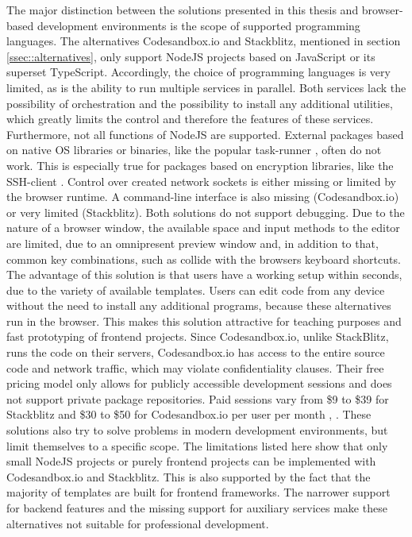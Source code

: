         The major distinction between the solutions presented in this thesis and browser-based development environments is the scope of supported programming languages. The alternatives Codesandbox.io and Stackblitz, mentioned in section \ref{ssec::alternatives}, only support NodeJS projects based on JavaScript or its superset TypeScript. Accordingly, the choice of programming languages is very limited, as is the ability to run multiple services in parallel. Both services lack the possibility of orchestration and the possibility to install any additional utilities, which greatly limits the control and therefore the features of these services. \newline
        Furthermore, not all functions of NodeJS are supported. External packages based on native \ac{OS} libraries or binaries, like the popular task-runner , often do not work. This is especially true for packages based on encryption libraries, like the \ac{SSH}-client . Control over created network sockets is either missing or limited by the browser runtime. A command-line interface is also missing (Codesandbox.io) or very limited (Stackblitz). Both solutions do not support debugging. Due to the nature of a browser window, the available space and input methods to the editor are limited, due to an omnipresent preview window and, in addition to that, common key combinations, such as  collide with the browsers keyboard shortcuts.\newline
        The advantage of this solution is that users have a working setup within seconds, due to the variety of available templates. Users can edit code from any device without the need to install any additional programs, because these alternatives run in the browser. This makes this solution attractive for teaching purposes and fast prototyping of frontend projects.\newline
        Since Codesandbox.io, unlike StackBlitz, runs the code on their servers, Codesandbox.io has access to the entire source code and network traffic, which may violate confidentiality clauses. Their free pricing model only allows for publicly accessible development sessions and does not support private  package repositories. Paid sessions vary from \$9 to \$39 for Stackblitz and \$30 to \$50 for Codesandbox.io per user per month \cite{stackblitz}, \cite{codesandbox}. \newline
        These solutions also try to solve problems in modern development environments, but limit themselves to a specific scope. The limitations listed here show that only small NodeJS projects or purely frontend projects can be implemented with Codesandbox.io and Stackblitz. This is also supported by the fact that the majority of templates are built for frontend frameworks. The narrower support for backend features and the missing support for auxiliary services make these alternatives not suitable for professional development.

